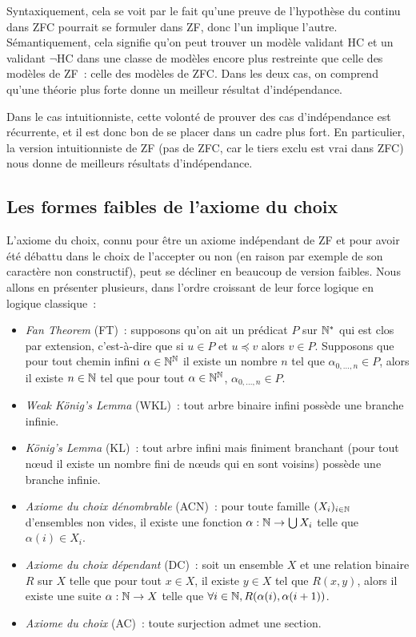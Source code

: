 \documentclass{article}
\begin{document}
Syntaxiquement, cela se voit par le fait qu'une preuve de l'hypothèse du continu dans ZFC pourrait se formuler dans ZF, donc l'un implique l'autre. Sémantiquement, cela signifie qu'on peut trouver un modèle validant HC et un validant $\lnot$HC dans une classe de modèles encore plus restreinte que celle des modèles de ZF~: celle des modèles de ZFC. Dans les deux cas, on comprend qu'une théorie plus forte donne un meilleur résultat d'indépendance.

Dans le cas intuitionniste, cette volonté de prouver des cas d'indépendance est récurrente, et il est donc bon de se placer dans un cadre plus fort. En particulier, la version intuitionniste de ZF (pas de ZFC, car le tiers exclu est vrai dans ZFC) nous donne de meilleurs résultats d'indépendance.

\subsection{Les formes faibles de l'axiome du choix}

L'axiome du choix, connu pour être un axiome indépendant de ZF et pour avoir été débattu dans le choix de l'accepter ou non (en raison par exemple de son caractère non constructif), peut se décliner en beaucoup de version faibles. Nous allons en présenter plusieurs, dans l'ordre croissant de leur force logique en logique classique~:
\begin{itemize}
\item \textit{Fan Theorem} (FT)~: supposons qu'on ait un prédicat $P$ sur $\mathbb{N}^*$ qui est clos par extension, c'est-à-dire que si $u\in P$ et $u \preceq v$ alors $v\in P$. Supposons que pour tout chemin infini $\alpha\in\mathbb{N}^{\mathbb{N}}$ il existe un nombre $n$ tel que $\alpha_{0,\ldots,n}\in P$, alors il existe $n \in\mathbb{N}$ tel que pour tout $\alpha \in \mathbb{N}^{\mathbb{N}}$, $\alpha_{0,\ldots,n}\in P$.
\item \textit{Weak König's Lemma} (WKL)~: tout arbre binaire infini possède une branche infinie.
\item \textit{König's Lemma} (KL)~: tout arbre infini mais finiment branchant (pour tout n\oe ud il existe un nombre fini de n\oe uds qui en sont voisins) possède une branche infinie.
\item \textit{Axiome du choix dénombrable} (ACN)~: pour toute famille $(X_i)_{i\in \mathbb{N}}$ d'ensembles non vides, il existe une fonction $\alpha : \mathbb{N} \to \bigcup X_i$ telle que $\alpha(i)\in X_i$.
\item \textit{Axiome du choix dépendant} (DC)~: soit un ensemble $X$ et une relation binaire $R$ sur $X$ telle que pour tout $x\in X$, il existe $y\in X$ tel que $R(x,y)$, alors il existe une suite $\alpha : \mathbb{N} \to X$ telle que $\forall i\in \mathbb{N}, R(\alpha(i),\alpha(i+1))$.
\item \textit{Axiome du choix} (AC)~: toute surjection admet une section.
\end{itemize}
\end{document}

